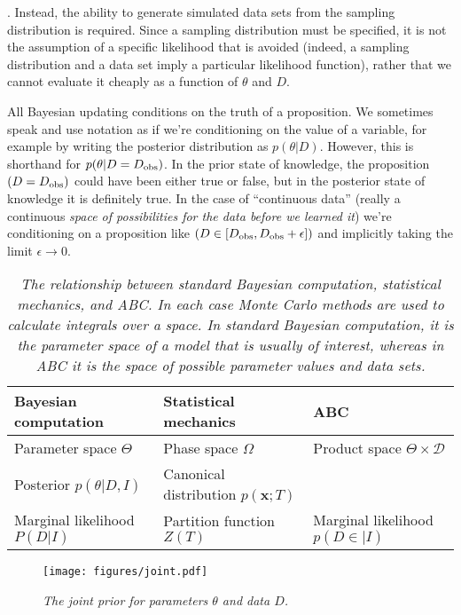 \documentclass[article]{jss}
\newcommand{\params}{\theta}
\newcommand{\data}{D}
\newcommand{\dobs}{D_{\rm obs}}
\begin{document}
. Instead, the ability to
generate simulated data sets from the sampling distribution is required.
Since a sampling distribution must be specified, it is not the assumption of
a specific likelihood that is avoided (indeed, a sampling distribution and
a data set imply a particular likelihood function), rather that we cannot
evaluate it cheaply as a function of $\params$ and $\data$.

All Bayesian updating conditions on the truth of a proposition. We sometimes
speak and use notation as if we're conditioning on the value of a variable, for
example by writing the posterior distribution as $p(\params | \data)$. However,
this is shorthand for $p(\params | \data = \dobs)$. In the prior state of
knowledge, the proposition $(\data = \dobs)$ could have been either true or
false, but in the posterior state of knowledge it is definitely true.
In the case of ``continuous data'' (really a continuous {\it space of
possibilities for the data before we learned it}) we're conditioning on a
proposition like $(\data \in [\dobs, \dobs+\epsilon])$ and implicitly
taking the limit $\epsilon \to 0$.

\begin{table}[ht!]
\centering
\small
\begin{tabular}{|l|l|l|}
\hline
Bayesian computation		&		Statistical mechanics		&		ABC\\
\hline
Parameter space	$\Theta$	&		Phase space	$\Omega$ 			& Product space $\Theta \times \mathcal{D}$\\
Posterior $p(\params | D,I)$   &  Canonical distribution $p(\boldsymbol{x}; T)$     & \\ 
Marginal likelihood $P(D|I)$	&	Partition function $Z(T)$	&   Marginal likelihood $p(D\in | I)$\\
\hline
\end{tabular}
\caption{\it The relationship between standard Bayesian computation, statistical
mechanics, and ABC. In each case Monte Carlo methods are used to calculate
integrals over a space. In standard Bayesian computation, it is the parameter
space of a model that is usually of interest, whereas in ABC it is the space
of possible parameter values {\it and} data sets.
\label{tab:relation}}
\end{table}


\begin{figure}[ht!]
\centering
\texttt{[image: figures/joint.pdf]}
\caption{\it The joint prior for parameters $\params$ and data $\data$.
\label{fig:joint}}
\end{figure}
\end{document}

